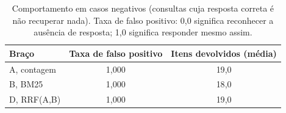 \begin{table}[htb]
\centering
\caption{Comportamento em casos negativos (consultas cuja resposta correta é não recuperar nada). Taxa de falso positivo: 0{,}0 significa reconhecer a ausência de resposta; 1{,}0 significa responder mesmo assim.}
\label{tab:retrieval-negatives-section}
\begin{tabular}{lcc}
\toprule
Braço & Taxa de falso positivo & Itens devolvidos (média) \\
\midrule
A, contagem & 1{,}000 & 19{,}0 \\
B, BM25 & 1{,}000 & 18{,}0 \\
D, RRF(A,B) & 1{,}000 & 19{,}0 \\
\bottomrule
\end{tabular}
\end{table}
